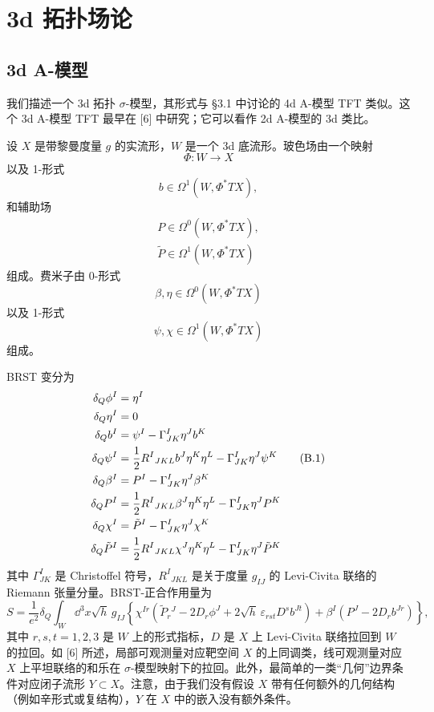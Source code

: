 \chapter{3d 拓扑场论}

\section{3d A-模型}

我们描述一个 3d 拓扑 $\sigma$-模型，其形式与 §3.1 中讨论的 4d A-模型 TFT 类似。这个 3d A-模型 TFT 最早在 [6] 中研究；它可以看作 2d A-模型的 3d 类比。

设 $X$ 是带黎曼度量 $g$ 的实流形，$W$ 是一个 3d 底流形。玻色场由一个映射
\[
  \Phi:W\to X
\]
以及 1-形式
\[
  b\in\Omega^1(W,\Phi^*TX),
\]
和辅助场
\begin{gather*}
  P\in\Omega^0(W,\Phi^*TX),\\
  \tilde P\in\Omega^1(W,\Phi^*TX)
\end{gather*}
组成。费米子由 0-形式
\[
  \beta,\eta\in\Omega^0(W,\Phi^*TX)
\]
以及 1-形式
\[
  \psi,\chi\in\Omega^1(W,\Phi^*TX)
\]
组成。


BRST 变分为
\begin{align}
  \delta_Q\phi^I &= \eta^I \notag\\
  \delta_Q\eta^I &= 0 \notag\\
  \delta_Qb^I &= \psi^I-\Gamma^I_{JK}\eta^Jb^K \notag\\
  \delta_Q\psi^I &= \frac12R^I{}_{JKL}b^J\eta^K\eta^L-\Gamma^I_{JK}\eta^J\psi^K \tag{B.1}\\
  \delta_Q\beta^I &= P^I-\Gamma^I_{JK}\eta^J\beta^K \notag\\
  \delta_QP^I &= \frac12R^I{}_{JKL}\beta^J\eta^K\eta^L-\Gamma^I_{JK}\eta^JP^K \notag\\
  \delta_Q\chi^I &= \tilde P^I-\Gamma^I_{JK}\eta^J\chi^K \notag\\
  \delta_Q\tilde P^I &= \frac12R^I{}_{JKL}\chi^J\eta^K\eta^L-\Gamma^I_{JK}\eta^J\tilde P^K \notag
\end{align}
其中 $\Gamma^I_{JK}$ 是 Christoffel 符号，$R^I{}_{JKL}$ 是关于度量 $g_{IJ}$ 的 Levi-Civita 联络的 Riemann 张量分量。BRST-正合作用量为
\[
  S=\frac{1}{e^2}\delta_Q\int_W\dd^3x\sqrt{h}\,g_{IJ}\left\{\chi^{Ir}\left(\tilde P_r{}^J-2D_r\phi^J+2\sqrt{h}\,\varepsilon_{rst}D^sb^{Jt}\right)+\beta^I\left(P^J-2D_rb^{Jr}\right)\right\},
\]
其中 $r,s,t=1,2,3$ 是 $W$ 上的形式指标，$D$ 是 $X$ 上 Levi-Civita 联络拉回到 $W$ 的拉回。如 [6] 所述，局部可观测量对应靶空间 $X$ 的上同调类，线可观测量对应 $X$ 上平坦联络的和乐在 $\sigma$-模型映射下的拉回。此外，最简单的一类“几何”边界条件对应闭子流形 $Y\subset X$。注意，由于我们没有假设 $X$ 带有任何额外的几何结构（例如辛形式或复结构），$Y$ 在 $X$ 中的嵌入没有额外条件。


